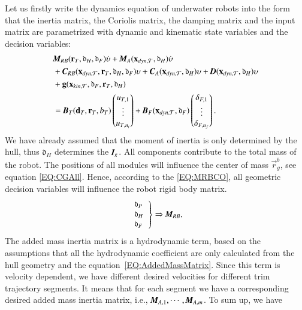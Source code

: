 Let us firstly write the dynamics equation of underwater robots into the form that the inertia matrix, the Coriolis matrix, the damping matrix and the input matrix are parametrized with dynamic and kinematic state variables and the decision variables:
\begin{align}
&\emph{\textbf{M}}_{RB}(\vec{r}_{T},\mathfrak{d}_{H},\mathfrak{d}_{F})\dot{\vec{\upsilon}}+\emph{\textbf{M}}_{A}(\vec{x}_{dyn,\mathcal{T}},\mathfrak{d}_{H})\dot{\vec{\upsilon}} \nonumber \\
&+\emph{\textbf{C}}_{RB}(\vec{x}_{dyn,\mathcal{T}},\vec{r}_{T},\mathfrak{d}_{H},\mathfrak{d}_{F})\vec{\upsilon}+ 
\emph{\textbf{C}}_{A}(\vec{x}_{dyn,\mathcal{T}},\mathfrak{d}_{H})\vec{\upsilon}+\emph{\textbf{D}}(\vec{x}_{dyn,\mathcal{T}},\mathfrak{d}_{H})\vec{\upsilon} \nonumber \\
&+\vec{g}(\vec{x}_{kin,\mathcal{T}},\mathfrak{d}_{F},\vec{r}_{T},\mathfrak{d}_{H}) \nonumber \\
&=\emph{\textbf{B}}_{T}(\vec{d}_{T},\vec{r}_{T},b_{T})
\begin{pmatrix}
u_{T,1}  \\ \vdots \\ u_{T,n_{t}}
\end{pmatrix}+
\emph{\textbf{B}}_{F}(\vec{x}_{dyn,\mathcal{T}},\mathfrak{d}_{F})
\begin{pmatrix}
\delta_{F,1}  \\ \vdots \\ \delta_{F,n_{f}}
\end{pmatrix}.\label{EQ:DecisionDynamics}
\end{align}
We have already assumed that the moment of inertia is only determined by the hull, thus $\mathfrak{d}_{H}$ determines the $\emph{\textbf{I}}_{g}$. All components contribute to the total mass of the robot. The positions of all modules will influence the center of mass $\vec{r}_{g}^{b}$, see equation \ref{EQ:CGAll}. Hence, according to the \ref{EQ:MRBCO}, all geometric decision variables will influence the robot rigid body matrix. 
\begin{align}
\left.\begin{tabular}{l}
$\mathfrak{d}_{P}$ \\
$\mathfrak{d}_{H}$ \\
$\mathfrak{d}_{F}$
\end{tabular}\right\}\Rightarrow \emph{\textbf{M}}_{RB},\label{EQ:DynamikRelationship1}
\end{align}
The added mass inertia matrix is a hydrodynamic term, based on the assumptions that all the hydrodynamic coefficient are only calculated from the hull geometry and the equation~\ref{EQ:AddedMassMatrix}. Since this term is velocity dependent, we have different desired velocities for different trim trajectory segments. It means that for each segment we have a corresponding desired added mass inertia matrix, i.e., $\emph{\textbf{M}}_{A,1}, \cdots, \emph{\textbf{M}}_{A,m}$. To sum up, we have 
